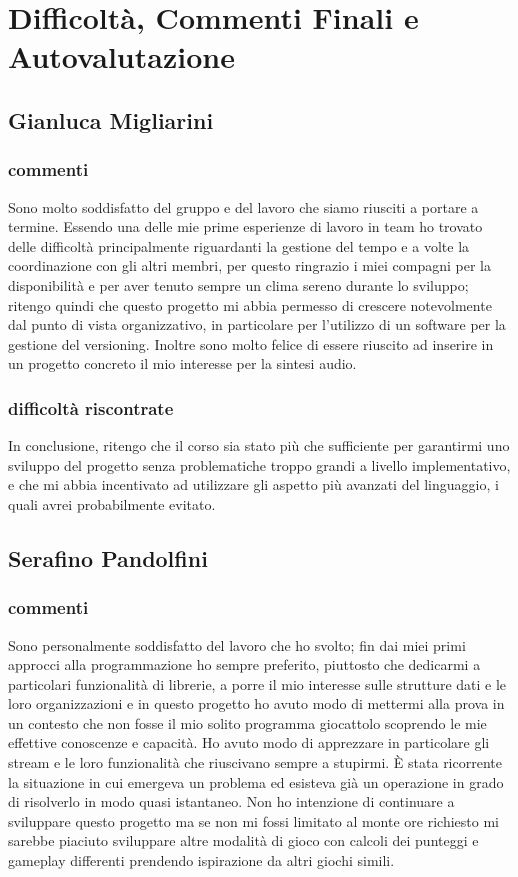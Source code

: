 \documentclass[a4paper,12pt]{report}
\begin{document}
\chapter{Difficoltà, Commenti Finali e Autovalutazione}


\section{Gianluca Migliarini}
\subsection{commenti}
Sono molto soddisfatto del gruppo e del lavoro che siamo riusciti a portare a termine.
Essendo una delle mie prime esperienze di lavoro in team ho trovato delle difficoltà principalmente riguardanti
la gestione del tempo e a volte la coordinazione con gli altri membri, per questo ringrazio i miei compagni per la disponibilità e per aver tenuto sempre un clima sereno durante lo sviluppo; ritengo quindi che questo progetto mi abbia permesso di crescere notevolmente dal punto di vista organizzativo, in particolare per l'utilizzo di un software per la gestione del versioning.
Inoltre sono molto felice di essere riuscito ad inserire in un progetto concreto il mio interesse per la sintesi audio.
\subsection{difficoltà riscontrate}
In conclusione, ritengo che il corso sia stato più che sufficiente per garantirmi uno sviluppo del progetto senza problematiche troppo grandi a livello implementativo, e che mi abbia incentivato ad utilizzare gli aspetto più avanzati del linguaggio, i quali avrei probabilmente evitato.
\newpage
\section{Serafino Pandolfini}
\subsection{commenti}
Sono personalmente soddisfatto del lavoro che ho svolto; fin dai miei primi approcci alla programmazione ho sempre preferito, piuttosto che dedicarmi a particolari funzionalità di librerie, a porre il mio interesse sulle strutture dati e le loro organizzazioni e in questo progetto ho avuto modo di mettermi alla prova in un contesto che non fosse il mio solito programma giocattolo scoprendo le mie effettive conoscenze e capacità. Ho avuto modo di apprezzare in particolare gli stream e le loro funzionalità che riuscivano sempre a stupirmi. È stata ricorrente la situazione in cui emergeva un problema ed esisteva già un operazione in grado di risolverlo in modo quasi istantaneo.
Non ho intenzione di continuare a sviluppare questo progetto ma se non mi fossi limitato al monte ore richiesto mi sarebbe piaciuto sviluppare altre modalità di gioco con calcoli dei punteggi e gameplay differenti prendendo ispirazione da altri giochi simili. 
\end{document}
